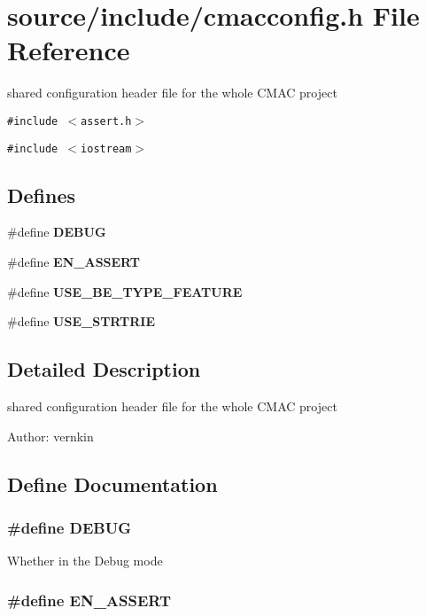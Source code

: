 \section{source/include/cmacconfig.h File Reference}
\label{cmacconfig_8h}
shared configuration header file for the whole CMAC project  


{\tt \#include $<$assert.h$>$}\par
{\tt \#include $<$iostream$>$}\par
\subsection*{Defines}
\begin{CompactItemize}
\item 
\#define {\bf DEBUG}
\item 
\#define {\bf EN\_\-ASSERT}
\item 
\#define {\bf USE\_\-BE\_\-TYPE\_\-FEATURE}
\item 
\#define {\bf USE\_\-STRTRIE}
\end{CompactItemize}


\subsection{Detailed Description}
shared configuration header file for the whole CMAC project 

\begin{Desc}
\item[Author:]vernkin \end{Desc}


\subsection{Define Documentation}
\subsubsection[{DEBUG}]{\setlength{\rightskip}{0pt plus 5cm}\#define DEBUG}\label{cmacconfig_8h_d72dbcf6d0153db1b8d8a58001feed83}


Whether in the Debug mode 
\subsubsection[{EN\_\-ASSERT}]{\setlength{\rightskip}{0pt plus 5cm}\#define EN\_\-ASSERT}\label{cmacconfig_8h_126df696f0f6a8d1ec5ab4bf14b20054}



